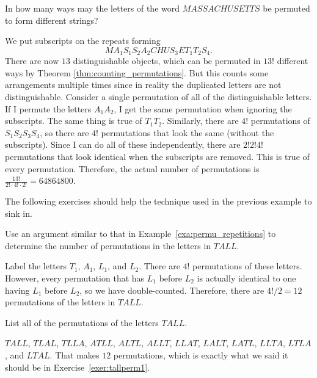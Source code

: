 \begin{exa}\label{exa:permu_repetitions}
In how many ways may the letters of the word $MASSACHUSETTS$ be
permuted to form different strings?
\begin{sol} We put subscripts on the repeats forming
$$MA_1S_1S_2A_2CHUS_3ET_1T_2S_4.$$There are now $13$
distinguishable objects, which can be permuted in $13!$ different
ways by Theorem \ref{thm:counting_permutations}. 
But this counts some arrangements multiple times since in reality
the duplicated letters are not distinguishable.
Consider a single permutation of all of the distinguishable letters.
If I permute the letters $A_1A_2$, I get the same permutation when ignoring the subscripts.
The same thing is true of $T_1T_2$. Similarly, there are $4!$ permutations of $S_1S_2S_3S_4$,
so there are $4!$ permutations that look the same (without the subscripts).
Since I can do all of these independently, there are $2!2!4!$ permutations that look identical
when the subscripts are removed.  This is true of every permutation.  
Therefore, the actual number of permutations is 
$\displaystyle\frac{13!}{2!\cdot 4!\cdot 2!} = 64864800.$
\end{sol}
\end{exa}

The following exercises should help the technique used in the previous example to sink in.

\begin{exer}\label{exer:tallperm1}
Use an argument similar to that in Example~\ref{exa:permu_repetitions} to 
determine the number of permutations in the letters in $TALL$.

\noindent
\answerlinetwo
\begin{answer}
Label the letters $T_1$, $A_1$, $L_1$, and $L_2$.  There are $4!$ permutations of these letters.
However, every permutation that has $L_1$ before $L_2$ is actually identical to one having
$L_1$ before $L_2$, so we have double-counted.  Therefore, there are $4!/2=12$ permutations
of the letters in $TALL$.
\end{answer}
\end{exer}

\begin{exer}
List all of the permutations of the letters $TALL$.

\noindent
\answerlinetwo
\begin{answer}
$TALL$, $TLAL$, $TLLA$, $ATLL$, $ALTL$, $ALLT$, $LLAT$, $LALT$, $LATL$, $LLTA$, $LTLA$, and $LTAL$.
That makes $12$ permutations, which is exactly what we said it should be in Exercise~\ref{exer:tallperm1}.
\end{answer}
\end{exer}

